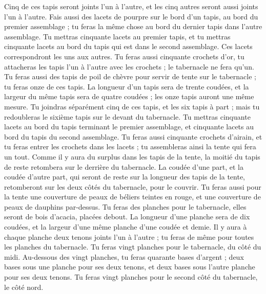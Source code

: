 \begin{multicols}{2}
Cinq de ces tapis seront joints l'un à l'autre, et les cinq autres seront aussi joints l'un à l'autre.
Fais aussi des lacets de pourpre sur le bord d'un tapis, au bord du premier assemblage ; tu feras la même chose au bord du dernier tapis dans l'autre assemblage.
Tu mettras cinquante lacets au premier tapis, et tu mettras cinquante lacets au bord du tapis qui est dans le second assemblage. Ces lacets correspondront les uns aux autres.
Tu feras aussi cinquante crochets d'or, tu attacheras les tapis l'un à l'autre avec les crochets ; le tabernacle ne fera qu’un.
Tu feras aussi des tapis de poil de chèvre pour servir de tente sur le tabernacle ; tu feras onze de ces tapis.
La longueur d'un tapis sera de trente coudées, et la largeur du même tapis sera de quatre coudées ; les onze tapis auront une même mesure.
Tu joindras séparément cinq de ces tapis, et les six tapis à part ; mais tu redoubleras le sixième tapis sur le devant du tabernacle.
Tu mettras cinquante lacets au bord du tapis terminant le premier assemblage, et cinquante lacets au bord du tapis du second assemblage.
Tu feras aussi cinquante crochets d'airain, et tu feras entrer les crochets dans les lacets ; tu assembleras ainsi la tente qui fera un tout.
Comme il y aura du surplus dans les tapis de la tente, la moitié du tapis de reste retombera sur le derrière du tabernacle.
La coudée d’une part, et la coudée d’autre part, qui seront de reste sur la longueur des tapis de la tente, retomberont sur les deux côtés du tabernacle, pour le couvrir.
Tu feras aussi pour la tente une couverture de peaux de béliers teintes en rouge, et une couverture de peaux de dauphins par-dessus.
Tu feras des planches pour le tabernacle, elles seront de bois d’acacia, placées debout.
La longueur d'une planche sera de dix coudées, et la largeur d’une même planche d'une coudée et demie.
Il y aura à chaque planche deux tenons joints l’un à l’autre ; tu feras de même pour toutes les planches du tabernacle.
Tu feras vingt planches pour le tabernacle, du côté du midi.
Au-dessous des vingt planches, tu feras quarante bases d'argent ; deux bases sous une planche pour ses deux tenons, et deux bases sous l'autre planche pour ses deux tenons.
Tu feras vingt planches pour le second côté du tabernacle, le côté nord.

\end{multicols}
